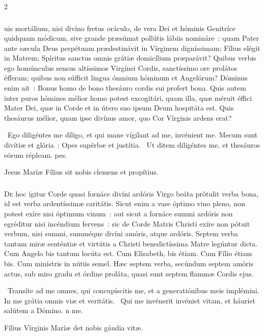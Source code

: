 \documentclass[9pt,twoside]{extarticle}
\begin{document}
\begin{multicols}{2}
{\subsubsection*{\center {}}
uis mortálium, nisi divíno fretus oráculo, de vera Dei et hóminis Genitríce quidquam módicum, sive grande præsúmat pollútis lábiis nomináre~: quam Pater ante sæcula Deus perpétuam prædestinávit in Vírginem digníssimam; Fílius elégit in Matrem; Spíritus sanctus omnis grátiæ domicílium præparávit? Quibus verbis ego homúnculus sensus altíssimos Virgínei Cordis, sanctíssimo ore prolátos éfferam; quibus non súfficit lingua ómnium hóminum et Angelórum? Dóminus enim ait~: Bonus homo de bono thesáuro cordis sui profert bona. Quis autem inter puros hómines mélior homo potest excogitári, quam illa, quæ méruit éffici Mater Dei, quæ in Corde et in útero suo ipsum Deum hospitáta est. Quis thesáurus mélior, quam ipse divínus amor, quo Cor Vírginis ardens erat?

\begin{tightlist}{}
\item {}~Ego diligéntes me díligo, et qui mane vígilant ad me, invénient me. Mecum sunt divítiæ et glória~: \textred{*} Opes supérbæ et justítia. ~Ut ditem diligéntes me, et thesáuros eórum répleam. pes.
\item {} Jesus Maríæ Fílius sit nobis clemens et propítius.
\end{tightlist}

\subsubsection*{\center {}}
\lettrine{D}e hoc ígitur Corde quasi fornáce divíni ardóris Virgo beáta prótulit verba bona, id est verba ardentíssimæ caritátis. Sicut enim a vase óptimo vino pleno, non potest exíre nisi óptimum vinum~: aut sicut a fornáce summi ardóris non egréditur nisi incéndium fervens~: sic de Corde Matris Christi exíre non pótuit verbum, nisi summi, summéque divíni amóris, atque ardóris. Septem verba tantum miræ senténtiæ et virtútis a Christi benedictíssima Matre legúntur dicta. Cum Angelo bis tantum locúta est. Cum Elísabeth, bis étiam. Cum Fílio étiam bis. Cum minístris in nútiis semel. Hæc septem verba, secúndum septem amóris actus, sub miro gradu et órdine proláta, quasi sunt septem flammæ Cordis ejus.


\begin{tightlist}{}
\item {}~Transíte ad me omnes, qui concupíscitis me, et a generatiónibus meis implémini. \textred{*} In me grátia omnis viæ et veritátis. ~Qui me invénerit invéniet vitam, et háuriet salútem a Dómino. n me.
\item {} Fílius Vírginis Maríæ det nobis gáudia vitæ.
\end{tightlist}

}
\end{multicols}
\end{document}
